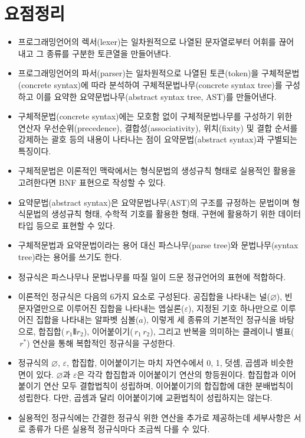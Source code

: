\section*{요점정리}
\begin{itemize}
\item 프로그래밍언어의 렉서(lexer)는 일차원적으로 나열된 문자열로부터
      어휘를 끊어내고 그 종류를 구분한 토큰열을 만들어낸다.
\item 프로그래밍언어의 파서(parser)는 일차원적으로 나열된
      토큰(token)을 구체적문법(concrete syntax)에 따라 분석하여
      구체적문법나무(concrete syntax tree)를 구성하고 이를 요약한
      요약문법나무(abstract syntax tree, AST)를 만들어낸다.
\item 구체적문법(concrete syntax)에는 모호함 없이 구체적문법나무를
      구성하기 위한 연산자 우선순위(precedence), 결합성(associativity),
      위치(fixity) 및 결합 순서를 강제하는 괄호 등의 내용이 나타나는
      점이 요약문법(abstract syntax)과 구별되는 특징이다.
\item 구체적문법은 이론적인 맥락에서는 형식문법의 생성규칙 형태로
      실용적인 활용을 고려한다면 BNF 표현으로 작성할 수 있다.
\item 요약문법(abstract syntax)은 요약문법나무(AST)의 구조를 규정하는
      문법이며 형식문법의 생성규칙 형태, 수학적 기호를 활용한 형태,
      구현에 활용하기 위한 데이터 타입 등으로 표현할 수 있다.
\item 구체적문법과 요약문법이라는 용어 대신 파스나무(parse tree)와
      문법나무(syntax tree)라는 용어를 쓰기도 한다.
\item 정규식은 파스나무나 문법나무를 따질 일이 드문 정규언어의 표현에 적합하다.
\item 이론적인 정규식은 다음의 6가지 요소로 구성된다.
      공집합을 나타내는 널($\varnothing$),
      빈 문자열만으로 이루어진 집합을 나타내는 엡실론($\varepsilon$),
      지정된 기호 하나만으로 이루어진 집합을 나타내는 알파벳 심볼($a$),
      이렇게 세 종류의 기본적인 정규식을 바탕으로, 합집합($\,r_1 \VERT r_2$),
      이어붙이기($\,r_1\,r_2$), 그리고 반복을 의미하는 클레이니 별표($\,r^{*}$) 연산을
      통해 복합적인 정규식을 구성한다.
\item 정규식의 $\varnothing$, $\varepsilon$, 합집합, 이어붙이기는 마치 자연수에서
      0, 1, 덧셈, 곱셈과 비슷한 면이 있다. $\varnothing$과 $\varepsilon$은
      각각 합집합과 이어붙이기 연산의 항등원이다. 합집합과 이어붙이기 연산
      모두 결합법칙이 성립하며, 이어붙이기의 합집합에 대한 분배법칙이 성립한다.
      다만, 곱셈과 달리 이어붙이기에 교환법칙이 성립하지는 않는다.
\item 실용적인 정규식에는 간결한 정규식 위한 연산을 추가로 제공하는데
      세부사항은 서로 종류가 다른 실용적 정규식마다 조금씩 다를 수 있다. 
\end{itemize}


